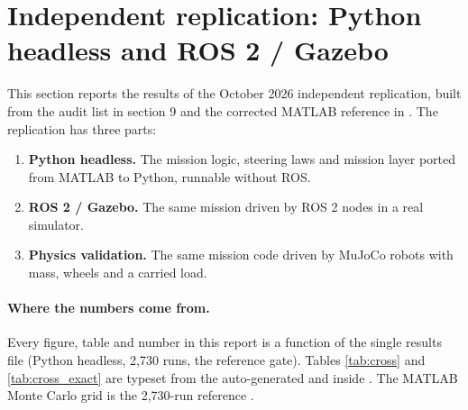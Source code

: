 %

\section{Independent replication: Python headless and ROS 2 / Gazebo}
\label{sec:replication}

This section reports the results of the October 2026 independent replication,
built from the audit list in  section 9 and
the corrected MATLAB reference in . The
replication has three parts:

\begin{enumerate}[leftmargin=1.9em]
\item \textbf{Python headless.} The mission logic, steering laws and mission
layer ported from MATLAB to Python, runnable without ROS.
\item \textbf{ROS 2 / Gazebo.} The same mission driven by ROS 2 nodes in a
real simulator.
\item \textbf{Physics validation.} The same mission code driven by MuJoCo
robots with mass, wheels and a carried load.
\end{enumerate}

\paragraph{Where the numbers come from.}
Every figure, table and number in this report is a function of the single
results file  (Python headless, 2,730
runs, the reference gate). Tables \ref{tab:cross} and \ref{tab:cross_exact}
are typeset from the auto-generated  and
 inside
. The MATLAB Monte Carlo grid is the 2,730-run
reference .

